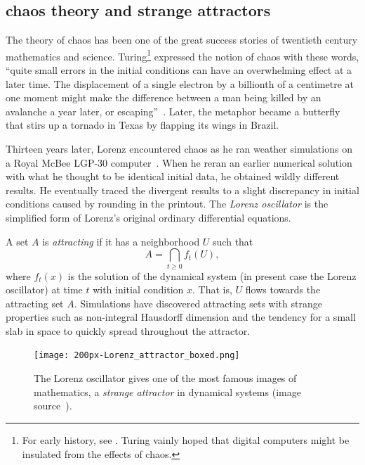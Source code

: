 \documentclass{llncs}
\begin{document}
\subsection{chaos theory and strange attractors}

The theory of chaos has been one of the great success stories of
twentieth century mathematics and science.   Turing\footnote{For
  early history, see \cite[p.~971]{Wolfram:NKS}. Turing vainly hoped that
  digital computers might be insulated from the effects of chaos.}
expressed the notion of chaos with these words, ``quite small errors
in the initial conditions can have an overwhelming effect at a later
time.  The displacement of a single electron by a billionth of a
centimetre at one moment might make the difference between a man being
killed by an avalanche a year later, or escaping''~\cite{Tu50}.
Later, the metaphor became a butterfly
that stirs up a tornado in Texas by flapping its wings in Brazil.

Thirteen years later, Lorenz encountered chaos as he ran weather
simulations on a Royal McBee LGP-30 computer~\cite{Lo63}.  When he
reran an earlier numerical solution with what he thought to be
identical initial data, he obtained wildly different results.  He
eventually traced the divergent results to a slight discrepancy in
initial conditions caused by rounding in the printout.  The {\it Lorenz
  oscillator} is the simplified form of Lorenz's original ordinary
differential equations.

A set $A$ is {\it attracting} if it has a neighborhood $U$ such
that
\[
A = \bigcap_{t\ge 0} f_t(U),
\]
where $f_t(x)$ is the solution of the dynamical system (in present
case the Lorenz oscillator) at time $t$ with initial condition
$x$. That is, $U$ flows towards the attracting set $A$.  Simulations
have discovered attracting sets with strange properties such as
non-integral Hausdorff dimension and the tendency for a small slab in 
space to quickly spread throughout the attractor.


\begin{figure}[h!]
  \centering
\texttt{[image: 200px-Lorenz\_attractor\_boxed.png]}
  \caption{The Lorenz oscillator gives one of the
most famous images of mathematics, a {\it strange attractor} in
dynamical systems (image source~\cite{Lor11}).}
\label{fig:lorenz}
\end{figure}
\end{document}
